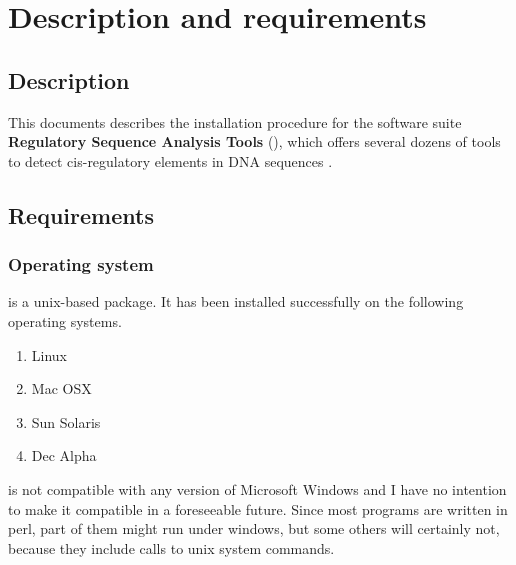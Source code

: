 \documentclass[12pt,a4paper, oneside]{scrreprt} %
\begin{document}


\newpage
\tableofcontents
\newpage

\chapter{Description and requirements}

\section{Description}

This documents describes the installation procedure for the software
suite \textbf{Regulatory Sequence Analysis Tools} (\RSAT), which
offers several dozens of tools to detect cis-regulatory elements in
DNA sequences
\cite{Thomas-Chollier:2008:W119-27,vanHelden:2003:3593-6,vanHelden:2000:177-87}.

\section{Requirements}

\subsection{Operating system}

\RSAT is a unix-based package. It has been installed successfully on
the following operating systems.

\begin{enumerate}
\item Linux

\item Mac OSX

\item Sun Solaris

\item Dec Alpha

\end{enumerate}

\RSAT is not compatible with any version of Microsoft Windows and I
have no intention to make it compatible in a foreseeable future. Since
most programs are written in perl, part of them might run under
windows, but some others will certainly not, because they include
calls to unix system commands.
\end{document}
